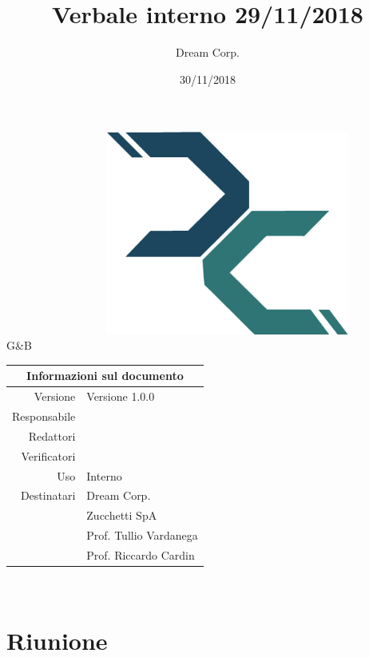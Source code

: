 \documentclass[12pt]{article}
\title{\fontsize{40}{40}\selectfont Verbale interno 29/11/2018}
\author{Dream Corp.}
\date{30/11/2018}
\newcommand{\red}{\mat}
\newcommand{\verp}{\daL}
\newcommand{\res}{\daG}
\newcommand{\version}{Versione 1.0.0}
\newcommand{\use}{Interno}
\begin{document}
\maketitle
	\begin{center}
	~~~~~~~~~~~~~~~~~~\includegraphics[width = 80mm]{../../logo.png}
	\newline
	\huge 
	\\G\&B
	
	\begin{table}[!htpb]
		\centering
		\begin{tabular}{r|l}
			\multicolumn{2}{c}{Informazioni sul documento}\\
			\hline
			Versione & \version \\
			Responsabile & \res\\
			Redattori & \red \\
			Verificatori & \verp\\
			Uso & \use\\
			Destinatari & Dream Corp. \\
			& Zucchetti SpA\\
			& Prof. Tullio Vardanega\\
			& Prof. Riccardo Cardin\\
		\end{tabular}
	\end{table}
	
	\end{center}
	\newpage

\newline
~\newline


\section{Riunione}
\end{document}
